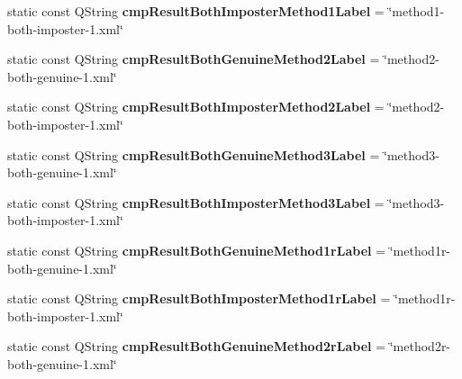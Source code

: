 \begin{DoxyCompactItemize}
\item 
\hypertarget{class_common_a6b9e866906495248066c232eb9431496}{static const Q\+String {\bfseries cmp\+Result\+Both\+Imposter\+Method1\+Label} = \char`\"{}method1-\/both-\/imposter-\/1.xml\char`\"{}}\label{class_common_a6b9e866906495248066c232eb9431496}

\item 
\hypertarget{class_common_ab51c211c70e4d21cc66a85bad3af682c}{static const Q\+String {\bfseries cmp\+Result\+Both\+Genuine\+Method2\+Label} = \char`\"{}method2-\/both-\/genuine-\/1.xml\char`\"{}}\label{class_common_ab51c211c70e4d21cc66a85bad3af682c}

\item 
\hypertarget{class_common_ab6d3b3213c5d7c990be46e250cdded34}{static const Q\+String {\bfseries cmp\+Result\+Both\+Imposter\+Method2\+Label} = \char`\"{}method2-\/both-\/imposter-\/1.xml\char`\"{}}\label{class_common_ab6d3b3213c5d7c990be46e250cdded34}

\item 
\hypertarget{class_common_a475ea9f252b8b5251a3e4e7a00c88990}{static const Q\+String {\bfseries cmp\+Result\+Both\+Genuine\+Method3\+Label} = \char`\"{}method3-\/both-\/genuine-\/1.xml\char`\"{}}\label{class_common_a475ea9f252b8b5251a3e4e7a00c88990}

\item 
\hypertarget{class_common_a6402665e6b40ad1d3878f0ed6ca697e0}{static const Q\+String {\bfseries cmp\+Result\+Both\+Imposter\+Method3\+Label} = \char`\"{}method3-\/both-\/imposter-\/1.xml\char`\"{}}\label{class_common_a6402665e6b40ad1d3878f0ed6ca697e0}

\item 
\hypertarget{class_common_a0dd89f0e1ee7b69d3531319f05ef23b4}{static const Q\+String {\bfseries cmp\+Result\+Both\+Genuine\+Method1r\+Label} = \char`\"{}method1r-\/both-\/genuine-\/1.xml\char`\"{}}\label{class_common_a0dd89f0e1ee7b69d3531319f05ef23b4}

\item 
\hypertarget{class_common_a838627241477ffd9d29d4f563ab10d8b}{static const Q\+String {\bfseries cmp\+Result\+Both\+Imposter\+Method1r\+Label} = \char`\"{}method1r-\/both-\/imposter-\/1.xml\char`\"{}}\label{class_common_a838627241477ffd9d29d4f563ab10d8b}

\item 
\hypertarget{class_common_a0478163eae6a0c5c9d4b2a59a4100e3e}{static const Q\+String {\bfseries cmp\+Result\+Both\+Genuine\+Method2r\+Label} = \char`\"{}method2r-\/both-\/genuine-\/1.xml\char`\"{}}\label{class_common_a0478163eae6a0c5c9d4b2a59a4100e3e}


\end{DoxyCompactItemize}
